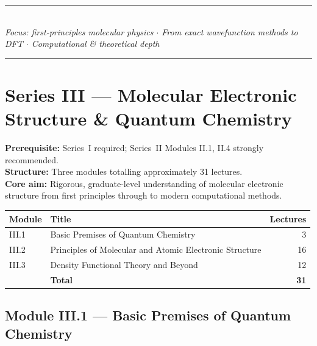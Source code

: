 \documentclass[11pt,a4paper]{article}
\begin{document}
\begin{center}
  \vfill
  {\color{accentgold}\rule{11cm}{0.8pt}}\\[0.4cm]
  {\small\itshape\color{white!80!darkblue}%
    Focus: first-principles molecular physics $\cdot$
    From exact wavefunction methods to DFT $\cdot$
    Computational \& theoretical depth}\\[0.3cm]
  {\color{accentgold}\rule{11cm}{0.8pt}}
\end{center}
\newpage
\nopagecolor
\color{black}

\section{Series III --- Molecular Electronic Structure \& Quantum Chemistry}
\label{sec:seriesIII}

\begin{tcolorbox}[seriesbox, title={Series~III Overview}]
\textbf{Prerequisite:} Series~I required; Series~II Modules II.1, II.4 strongly recommended.\\
\textbf{Structure:} Three modules totalling approximately 31 lectures.\\
\textbf{Core aim:} Rigorous, graduate-level understanding of molecular electronic structure
from first principles through to modern computational methods.\\[4pt]
\begin{tabular}{llr}
\toprule
\textbf{Module} & \textbf{Title} & \textbf{Lectures}\\
\midrule
III.1 & Basic Premises of Quantum Chemistry & 3\\
III.2 & Principles of Molecular and Atomic Electronic Structure & 16\\
III.3 & Density Functional Theory and Beyond & 12\\
\midrule
 & \textbf{Total} & \textbf{31}\\
\bottomrule
\end{tabular}
\end{tcolorbox}

\subsection{Module III.1 --- Basic Premises of Quantum Chemistry}
\label{sec:mod-III1}
\end{document}

